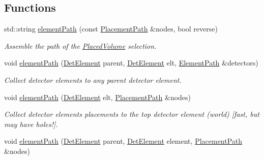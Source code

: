 \subsection*{Functions}
\begin{DoxyCompactItemize}
\item 
std::string \hyperlink{namespace_d_d4hep_1_1_geometry_1_1_detector_tools_a57debfb96b86738cbde272df6791a644}{elementPath} (const \hyperlink{namespace_d_d4hep_1_1_geometry_1_1_detector_tools_a6cc33285199e04dd336a33e6e62925e6}{PlacementPath} \&nodes, bool reverse)
\begin{DoxyCompactList}\small\item\em Assemble the path of the \hyperlink{class_d_d4hep_1_1_geometry_1_1_placed_volume}{PlacedVolume} selection. \item\end{DoxyCompactList}\item 
void \hyperlink{namespace_d_d4hep_1_1_geometry_1_1_detector_tools_a33429898caa7f3ec3083fe50f04d01bc}{elementPath} (\hyperlink{class_d_d4hep_1_1_geometry_1_1_det_element}{DetElement} parent, \hyperlink{class_d_d4hep_1_1_geometry_1_1_det_element}{DetElement} elt, \hyperlink{namespace_d_d4hep_1_1_geometry_1_1_detector_tools_a57c8f37a975258fd84676a69e74c56ab}{ElementPath} \&detectors)
\begin{DoxyCompactList}\small\item\em Collect detector elements to any parent detector element. \item\end{DoxyCompactList}\item 
void \hyperlink{namespace_d_d4hep_1_1_geometry_1_1_detector_tools_a2788bc98d530b548cab41a422c67b48b}{elementPath} (\hyperlink{class_d_d4hep_1_1_geometry_1_1_det_element}{DetElement} elt, \hyperlink{namespace_d_d4hep_1_1_geometry_1_1_detector_tools_a6cc33285199e04dd336a33e6e62925e6}{PlacementPath} \&nodes)
\begin{DoxyCompactList}\small\item\em Collect detector elements placements to the top detector element (world) \mbox{[}fast, but may have holes!\mbox{]}. \item\end{DoxyCompactList}\item 
void \hyperlink{namespace_d_d4hep_1_1_geometry_1_1_detector_tools_a1855be34405c9ce43c236cfba6914850}{elementPath} (\hyperlink{class_d_d4hep_1_1_geometry_1_1_det_element}{DetElement} parent, \hyperlink{class_d_d4hep_1_1_geometry_1_1_det_element}{DetElement} element, \hyperlink{namespace_d_d4hep_1_1_geometry_1_1_detector_tools_a6cc33285199e04dd336a33e6e62925e6}{PlacementPath} \&nodes)

\end{DoxyCompactItemize}
